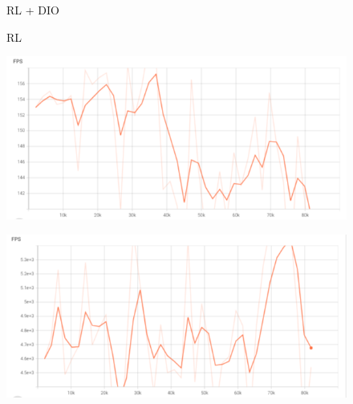    \begin{figure}[H]
      \centering
      \begin{minipage}{.5\textwidth}
        \centering
        \textsc{RL + DIO}
      \end{minipage}%
      \begin{minipage}{.5\textwidth}
        \centering
        \textsc{RL}
      \end{minipage}
      \vspace{0.2cm}

      \begin{minipage}{.5\textwidth}
        \centering
        \includegraphics[width=1\linewidth]{figures/diofps.png}
        \label{fig:fpsdio}
      \end{minipage}%
      \begin{minipage}{.5\textwidth}
        \centering
        \includegraphics[width=1\linewidth]{figures/rlfps.png}
        \label{fig:fpsrl}
      \end{minipage}
      \vspace{0.2cm}
      

\end{figure}

